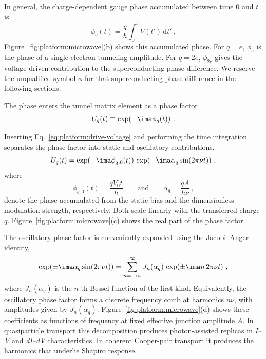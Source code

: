             In general, the charge-dependent gauge phase accumulated between time $0$ and $t$ is
            \begin{equation}
                \phi_q(t) = \frac{q}{\hbar} \int_0^t V(t')\, \mathrm{d}t'\,,
                \label{eq:platform:mw-phase}
            \end{equation}
            Figure~\ref{fig:platform:microwave}(b) shows this accumulated phase. For $q=e$, $\phi_e$ is the phase of a single-electron tunneling amplitude. For $q=2e$, $\phi_{2e}$ gives the voltage-driven contribution to the superconducting phase difference. We reserve the unqualified symbol $\phi$ for that superconducting phase difference in the following sections.

            The phase enters the tunnel matrix element as a phase factor 
            \begin{equation}
                U_q(t)\equiv \exp\!\left(-\ima\phi_q(t)\right)\,.
                \label{eq:platform:phase-factor}
            \end{equation}

            Inserting Eq.~\eqref{eq:platform:drive-voltage} and performing the time integration separates the phase factor into static and oscillatory contributions,
            \begin{align}
                U_q(t) = \exp\!\left(-\ima \phi_{q,0}(t)\right)\,
                \exp\!\left(-\ima \alpha_q \sin(2\pi\nu t)\right)\,,
                \label{eq:platform:mw-phase-decomposition}
            \end{align}
            where
            \begin{equation}
                \phi_{q,0}(t) = \frac{q V_0 t}{\hbar}
                \qquad\text{and}\qquad
                \alpha_q = \frac{q A}{h\nu}\,,
                \label{eq:platform:mw-drive-parameters}
            \end{equation}
            denote the phase accumulated from the static bias and the dimensionless modulation strength, respectively. Both scale linearly with the transferred charge $q$. Figure~\ref{fig:platform:microwave}(c) shows the real part of the phase factor.

            The oscillatory phase factor is conveniently expanded using the Jacobi--Anger identity,
            \begin{equation}
                \exp\!\left(\pm\ima\alpha_q \sin(2\pi\nu t)\right)
                = \sum_{n=-\infty}^{\infty} J_n(\alpha_q)\,
                \exp\!\left(\pm\ima n\, 2\pi\nu t\right)\,,
                \label{eq:platform:jacobi-anger}
            \end{equation}
            where $J_n(\alpha_q)$ is the $n$-th Bessel function of the first kind. Equivalently, the oscillatory phase factor forms a discrete frequency comb at harmonics $n\nu$, with amplitudes given by $J_n(\alpha_q)$. Figure~\ref{fig:platform:microwave}(d) shows these coefficients as functions of frequency at fixed effective junction amplitude $A$. In quasiparticle transport this decomposition produces photon-assisted replicas in \textit{I--V} and \textit{dI--dV} characteristics. In coherent Cooper-pair transport it produces the harmonics that underlie Shapiro response.

